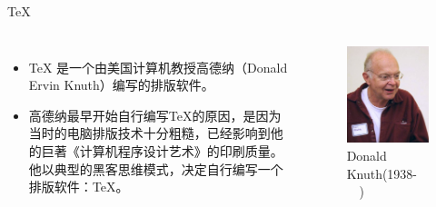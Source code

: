 \documentclass[13pt,fontset=mac]{ctexbeamer}
\begin{document}
\begin{frame}{TeX}
	
	
	\begin{columns}[c]  %
		
		\column{6cm}
		
		\begin{itemize}
			\item
			TeX
			是一个由美国计算机教授高德纳（Donald Ervin Knuth）编写的排版软件。
			
			\item 高德纳最早开始自行编写TeX的原因，是因为当时的电脑排版技术十分粗糙，已经影响到他的巨著《计算机程序设计艺术》的印刷质量。他以典型的黑客思维模式，决定自行编写一个排版软件：TeX。
		\end{itemize}
		
		
		\column{5cm} 
		\begin{figure}[p]
			\includegraphics[scale=0.5]{Knuth.jpg}
			\caption{Donald Knuth(1938-~~)}
		\end{figure}
		
	\end{columns}
	
	
\end{frame}
\end{document}

